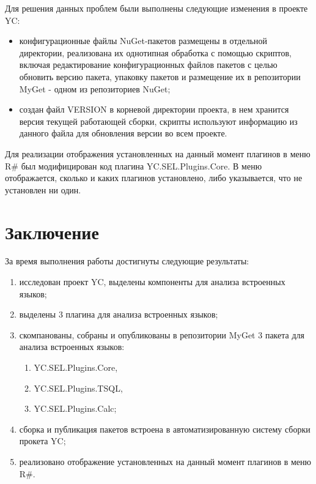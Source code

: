 \documentclass{matmex-diploma-custom}
\begin{document}
Для решения данных проблем были выполнены следующие изменения в проекте YC:

\begin{itemize}
\item
конфигурационные файлы NuGet-пакетов размещены в отдельной директории, реализована их однотипная обработка с помощью скриптов, включая редактирование конфигурационных файлов пакетов с целью обновить версию пакета, упаковку пакетов и размещение их в репозитории MyGet - одном из репозиториев NuGet;
\item
создан файл VERSION в корневой директории проекта, в нем хранится версия текущей работающей сборки, скрипты используют информацию из данного файла для обновления версии во всем проекте.
\end{itemize}

Для реализации отображения установленных на данный момент плагинов в меню R\# был модифицирован код плагина YC.SEL.Plugins.Core. В меню отображается, сколько и каких плагинов установлено, либо указывается, что не установлен ни один.


\section*{Заключение}

За время выполнения работы достигнуты следующие результаты:

\begin{enumerate}
\item
исследован проект YC, выделены компоненты для анализа встроенных языков;
\item
выделены 3 плагина для анализа встроенных языков;
\item
скомпанованы, собраны и опубликованы в репозитории MyGet 3 пакета для анализа встроенных языков:
\begin{enumerate}
\item
YC.SEL.Plugins.Core,
\item
YC.SEL.Plugins.TSQL,
\item
YC.SEL.Plugins.Calc;
\end{enumerate}
\item
сборка и публикация пакетов встроена в автоматизированную систему сборки прокета YC;
\item
реализовано отображение установленных на данный момент плагинов в меню R\#.
\end{enumerate}



\end{document}
